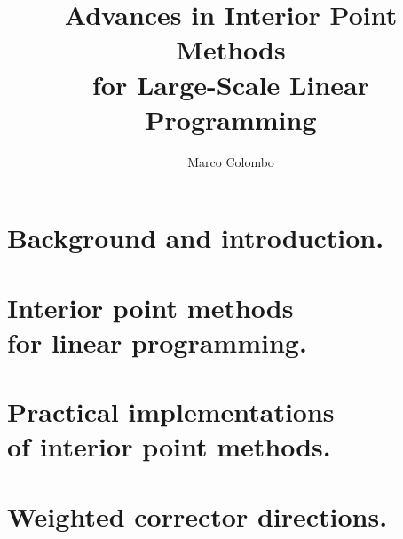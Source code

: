 \documentclass[phd,leftchapter]{msthesis}
\title{Advances in Interior Point Methods \\
       for Large-Scale Linear Programming}
\author{Marco Colombo}
\begin{document}
\maketitle

\dedication{
            Se'n foi me de chesta br\"ogna ch\'e? \\
\vspace{3em}
            If nothing else it true, well this is \\
	    If nothing else meant anything \\
	    The silence ended and I forgot\dots \\
\vspace{3em}
            I wish that I could find it, I wish I'd let it go \\
	    I wish my arms could hold it, will I ever know? \\
	    It may or may not happen\dots
}
\standarddeclaration

%
%
\begin{abstract}
  
\end{abstract}

%
%
\begin{acknowledgements}
  
\end{acknowledgements}

%
%
\tableofcontents

%
%
\chapter{Background and introduction.}


\chapter[Interior point methods for linear programming.]{Interior point methods \\ for linear programming.}


\chapter[Practical implementations of interior point methods.]{Practical implementations \\ of interior point methods.}


\chapter{Weighted corrector directions.}

\end{document}

